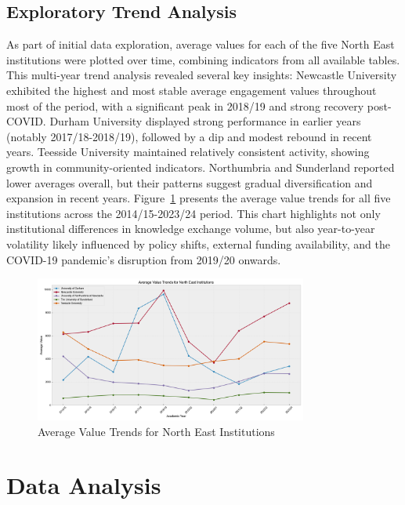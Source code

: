 \documentclass[journal,onecolumn, 10pt,draftclsnofoot]{IEEEtran}
\begin{document}
\subsection{Exploratory Trend Analysis}

As part of initial data exploration, average values for each of the five North East institutions were plotted over time, combining indicators from all available tables. This multi-year trend analysis revealed several key insights: Newcastle University exhibited the highest and most stable average engagement values throughout most of the period, with a significant peak in 2018/19 and strong recovery post-COVID. Durham University displayed strong performance in earlier years (notably 2017/18-2018/19), followed by a dip and modest rebound in recent years. Teesside University maintained relatively consistent activity, showing growth in community-oriented indicators. Northumbria and Sunderland reported lower averages overall, but their patterns suggest gradual diversification and expansion in recent years. Figure~\ref{fig:institutions-trends} presents the average value trends for all five institutions across the 2014/15-2023/24 period. This chart highlights not only institutional differences in knowledge exchange volume, but also year-to-year volatility likely influenced by policy shifts, external funding availability, and the COVID-19 pandemic's disruption from 2019/20 onwards.

\begin{figure}[h]
\centering
\includegraphics[width=0.8\textwidth]{Fig/figure2.ne_institutions_trends.png}
\caption{Average Value Trends for North East Institutions}
\label{fig:institutions-trends}
\end{figure}

\section{Data Analysis}
\end{document}
